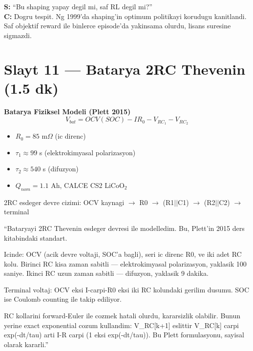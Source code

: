 \documentclass[11pt,a4paper]{article}
\begin{document}
\begin{soruboks}
\textbf{S:} ``Bu shaping yapay degil mi, saf RL degil mi?''\\
\textbf{C:} Dogru tespit. Ng 1999'da shaping'in optimum politikayi korudugu kanitlandi. Saf objektif reward ile binlerce episode'da yakinsama olurdu, lisans suresine sigmazdi.
\end{soruboks}

\section{Slayt 11 --- Batarya 2RC Thevenin (1.5 dk)}

\begin{slytboks}
\textbf{Batarya Fiziksel Modeli (Plett 2015)}
\[ V_{bat} = OCV(SOC) - I R_0 - V_{RC_1} - V_{RC_2} \]
\begin{itemize}
\item $R_0 = 85$ m$\Omega$ (ic direnc)
\item $\tau_1 \approx 99$ s (elektrokimyasal polarizasyon)
\item $\tau_2 \approx 540$ s (difuzyon)
\item $Q_{nom} = 1.1$ Ah, CALCE CS2 LiCoO$_2$
\end{itemize}
\end{slytboks}

\begin{gorselboks}
2RC esdeger devre cizimi: OCV kaynagi $\to$ R0 $\to$ (R1$||$C1) $\to$ (R2$||$C2) $\to$ terminal
\end{gorselboks}

\begin{sayboks}
``Bataryayi 2RC Thevenin esdeger devresi ile modelledim. Bu, Plett'in 2015 ders kitabindaki standart.

Icinde: OCV (acik devre voltaji, SOC'a bagli), seri ic direnc R0, ve iki adet RC kolu. Birinci RC kisa zaman sabitli --- elektrokimyasal polarizasyon, yaklasik 100 saniye. Ikinci RC uzun zaman sabitli --- difuzyon, yaklasik 9 dakika.

Terminal voltaj: OCV eksi I-carpi-R0 eksi iki RC kolundaki gerilim dusumu. SOC ise Coulomb counting ile takip ediliyor.

RC kollarini forward-Euler ile cozmek hatali olurdu, kararsizlik olabilir. Bunun yerine exact exponential cozum kullandim: V\_RC[k+1] eslittir V\_RC[k] carpi exp(-dt/tau) arti I-R carpi (1 eksi exp(-dt/tau)). Bu Plett formulasyonu, sayisal olarak kararli.''
\end{sayboks}
\end{document}

